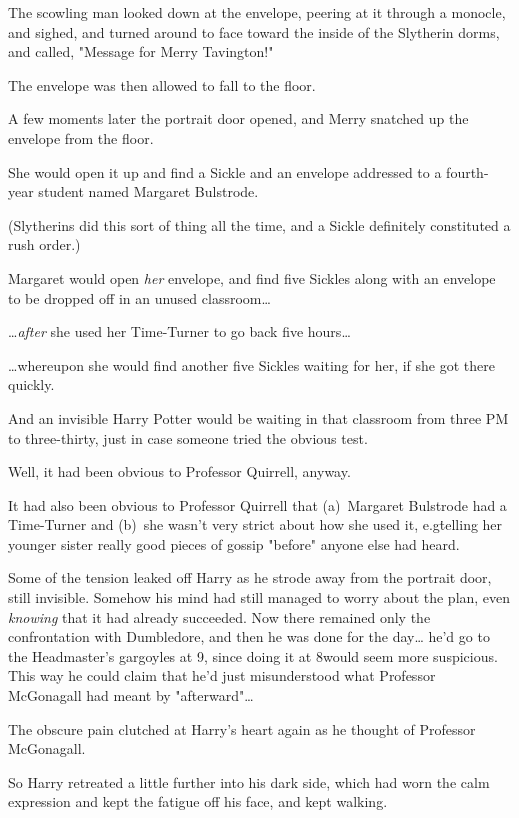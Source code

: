 The scowling man looked down at the envelope, peering at it through a monocle,
and sighed, and turned around to face toward the inside of the Slytherin dorms,
and called, "Message for Merry Tavington!"

The envelope was then allowed to fall to the floor.

A few moments later the portrait door opened, and Merry snatched up the
envelope from the floor.

She would open it up and find a Sickle and an envelope addressed to a
fourth-year student named Margaret Bulstrode.

(Slytherins did this sort of thing all the time, and a Sickle definitely
constituted a rush order.)

Margaret would open \emph{her} envelope, and find five Sickles along with an
envelope to be dropped off in an unused classroom{\ldots}

{\ldots}\emph{after} she used her Time-Turner to go back five hours{\ldots}

{\ldots}whereupon she would find another five Sickles waiting for her, if she
got there quickly.

And an invisible Harry Potter would be waiting in that classroom from three PM
to three-thirty, just in case someone tried the obvious test.

Well, it had been obvious to Professor Quirrell, anyway.

It had also been obvious to Professor Quirrell that (a)~Margaret Bulstrode had
a Time-Turner and (b)~she wasn't very strict about how she used it, e.g\.
telling her younger sister really good pieces of gossip "before" anyone else
had heard.

Some of the tension leaked off Harry as he strode away from the portrait door,
still invisible. Somehow his mind had still managed to worry about the plan,
even \emph{knowing} that it had already succeeded. Now there remained only the
confrontation with Dumbledore, and then he was done for the day{\ldots} he'd go
to the Headmaster's gargoyles at 9\PM, since doing it at 8\PM would seem more
suspicious. This way he could claim that he'd just misunderstood what Professor
McGonagall had meant by "afterward"{\ldots}

The obscure pain clutched at Harry's heart again as he thought of Professor
McGonagall.

So Harry retreated a little further into his dark side, which had worn the calm
expression and kept the fatigue off his face, and kept walking.

